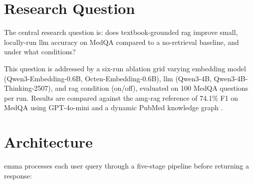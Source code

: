 \section{Research Question}

The central research question is: does textbook-grounded \gls{rag} improve small, locally-run \gls{llm} accuracy on MedQA compared to a no-retrieval baseline, and under what conditions? 

This question is addressed by a six-run ablation grid varying embedding model (Qwen3-Embedding-0.6B, Octen-Embedding-0.6B), \gls{llm} (Qwen3-4B, Qwen3-4B-Thinking-2507), and \gls{rag} condition (on/off), evaluated on 100 MedQA questions per run. Results are compared against the \gls{amg-rag} reference of 74.1\% F1 on MedQA using GPT-4o-mini and a dynamic PubMed knowledge graph \cite{rezaei2025}.

\section{Architecture}

\gls{emma} processes each user query through a five-stage pipeline before returning a response:

